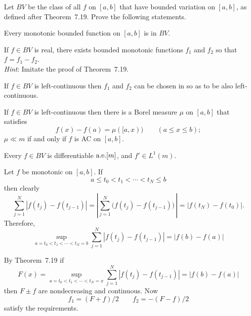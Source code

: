 \begin{enumerate}
\begin{itemize}
\end{itemize}


\begin{excopy}
Let \(BV\) be the class of all $f$ on \([a,b]\) that have bounded variation
on \([a,b]\), as defined after Theorem~7.19. Prove the following statements.
\begin{itemize}
Every monotonic bounded function on \([a,b]\) is in \(BV\).

If \(f \in BV\) is real, there exists bounded monotonic functions
\(f_1\) and \(f_2\) so that \(f=f_1-f_2\).\\
\emph{Hint}: Imitate the proof of Theorem~7.19.

If \(f\in BV\) is left-continuous then \(f_1\) and \(f_2\) 
can be chosen in  so as to be also left-continuous.

If \(f\in BV\) is left-continuous then there is a Borel measure \(\mu\) 
on \([a,b]\) that satisfies
\begin{equation*}
f(x) - f(a) = \mu([a,x)) \qquad (a\leq x \leq b);
\end{equation*}
\(\mu\ll m\) if and only if $f$ is AC on \([a,b]\).

Every \(f\in BV\) is differentiable \(\textrm{a.e.}[m]\), and \(f'\in L^1(m)\).
\end{itemize}
\end{excopy}

\begin{itemize}
Let $f$ be monotonic on \([a,b]\).
If 
\begin{equation*}
a\leq t_0 < t_1 < \cdots < t_N\leq b
\end{equation*}
then clearly 
\begin{equation*}
\sum_{j=1}^N |f(t_j) - f(t_{j-1})|
= \left| \sum_{j=1}^N \bigl(f(t_j) - f(t_{j-1})\bigr) \,\right|
= |f(t_N)-f(t_0)|.
\end{equation*}
Therefore,
\begin{equation*}
\sup_{a=t_0 < t_1 < \cdots < t_N=b} \sum_{j=1}^N |f(t_j) - f(t_{j-1})|
= |f(b)-f(a)|
\end{equation*}

By Theorem~7.19 \cite{RudinRCA87}
if
\begin{equation}  \label{eq:Fx:ex:7.13b}
F(x) = 
\sup_{a=t_0 < t_1 < \cdots < t_N=x} \sum_{j=1}^N |f(t_j) - f(t_{j-1})|
= |f(b)-f(a)|
\end{equation}
then \(F\pm f\) are nondecreasing and continuous.
Now
\begin{equation*}
f_1 = (F+f)/2 \qquad f_2 = -(F-f)/2
\end{equation*}
satisfy the requirements.


\end{itemize}
\end{enumerate}
